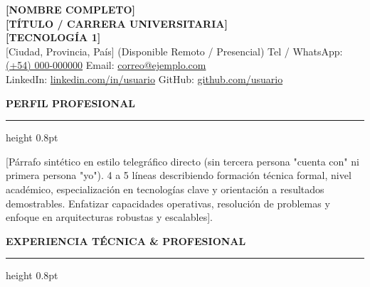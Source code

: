 \documentclass[9pt,a4paper]{extarticle}
\newcommand{\cvsection}[1]{%
  \vspace{4.5pt}%
  {\color{primary}\normalsize\bfseries\MakeUppercase{#1}}\par\vspace{1.5pt}%
  {\color{secondary}\hrule height 0.8pt}\par\vspace{3pt}%
}
\begin{document}
\color{darktext}

\begin{center}
    {\fontsize{17}{20}\selectfont \bfseries \color{primary} [NOMBRE COMPLETO]} \\[1.5pt]
    {\footnotesize \bfseries \color{darktext} [TÍTULO / CARRERA UNIVERSITARIA] \quad \textbar {}} \\[1.2pt]
    {\scriptsize \bfseries \color{secondary} [TECNOLOGÍA 1] \quad \textbar \quad [TECNOLOGÍA 2] \quad \textbar \quad [TECNOLOGÍA 3] \quad \textbar \quad [TECNOLOGÍA 4]} \\[2.5pt]
    
    \scriptsize
    [Ciudad, Provincia, País] (Disponible Remoto / Presencial) \quad \textbar \quad
    Tel / WhatsApp: \href{tel:+549000000000}{(+54) 000-000000} \quad \textbar \quad
    Email: \href{mailto:correo@ejemplo.com}{correo@ejemplo.com} \\
    LinkedIn: \href{https://linkedin.com/in/usuario}{linkedin.com/in/usuario} \quad \textbar \quad
    GitHub: \href{https://github.com/usuario}{github.com/usuario}
\end{center}

\vspace{-6pt}

\cvsection{Perfil Profesional}
[Párrafo sintético en estilo telegráfico directo (sin tercera persona "cuenta con" ni primera persona "yo"). 4 a 5 líneas describiendo formación técnica formal, nivel académico, especialización en tecnologías clave y orientación a resultados demostrables. Enfatizar capacidades operativas, resolución de problemas y enfoque en arquitecturas robustas y escalables].

\cvsection{Experiencia Técnica \& Profesional}
\end{document}

